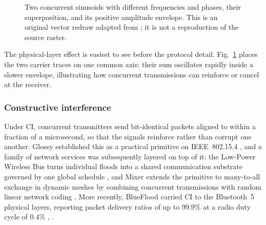 \documentclass[journal]{IEEEtran}
\newcommand{\CI}{CI}                      %
\begin{document}
\begin{figure}[!t]
{%
}
\caption{Two concurrent sinusoids with different frequencies and phases,
their superposition, and its positive amplitude envelope. This is an
original vector redraw adapted from \cite{alnahas19blueflood}; it is not a
reproduction of the source raster.}
\label{fig:ct-beating}
\end{figure}

The physical-layer effect is easiest to see before the protocol detail.
Fig.~\ref{fig:ct-beating} places the two carrier traces on one common
axis: their sum oscillates rapidly inside a slower envelope, illustrating
how concurrent transmissions can reinforce or cancel at the receiver.
\subsubsection{Constructive interference}
Under \CI, concurrent transmitters send bit-identical packets aligned to
within a fraction of a microsecond, so that the signals reinforce rather
than corrupt one another. Glossy established this as a practical primitive
on IEEE~802.15.4 \cite{ferrari11glossy}, and a family of network services
was subsequently layered on top of it: the Low-Power Wireless Bus turns
individual floods into a shared communication substrate governed by one
global schedule \cite{ferrari12lwb}, and Mixer extends the primitive to
many-to-all exchange in dynamic meshes by combining concurrent
transmissions with random linear network coding \cite{herrmann18mixer}.
More recently, BlueFlood carried \CI{} to the Bluetooth~5 physical layers,
reporting packet delivery ratios of up to $99.9\%$ at a radio duty cycle
of $0.4\%$ \cite{alnahas19blueflood}, \cite{alnahas21blueflood}.
\end{document}
